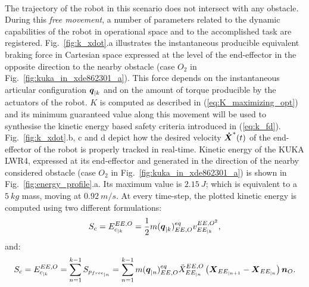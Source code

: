 \\
The trajectory of the robot in this scenario does not intersect with any obstacle. During this \textit{free movement}, a number of parameters related to the dynamic capabilities of the robot in operational space and to the accomplished task are registered. Fig.~\ref{fig:k_xdot}.a illustrates the instantaneous producible equivalent braking force in Cartesian space expressed at the level of the end-effector in the opposite direction to the nearby obstacle (case $O_2$ in Fig.~\ref{fig:kuka_in_xde862301_a}). This force depends on the instantaneous articular configuration $\mbox{\boldmath${q}$}_{|k}$ and on the amount of torque producible by the actuators of the robot. $K$ is computed as described in (\ref{eq:K_maximizing_opt}) and its minimum guaranteed value along this movement will be used to synthesise the kinetic energy based safety criteria introduced in (\ref{eq:k_fd}). Fig.~\ref{fig:k_xdot}.b, c and d depict how the desired velocity $\mbox{\boldmath${\dot{X}}$}^*(t)$ of the end-effector of the robot is properly tracked in real-time. 
Kinetic energy of the KUKA LWR4, expressed at its end-effector and generated in the direction of the nearby considered obstacle (case $O_2$ in Fig.~\ref{fig:kuka_in_xde862301_a}) is shown in Fig.~\ref{fig:energy_profile}.a. Its maximum value is $2.15~J$; which is equivalent to a $5~kg$ mass, moving at $0.92~m/s$.
At every time-step, the plotted kinetic energy is computed using two different formulations:
\begin{equation}
S_c = E_{c_{|k}}^{EE,O} = \frac{1}{2} m(\mbox{\boldmath${q}$}_{|k})_{EE,O}^{eq} v_{EE_{|k}}^{{EE,O}^2},
\label{eq:plotted_Sc}
\end{equation}
and: 
\begin{equation}
\begin{split}
S_c = E_{c_{|k}}^{EE,O} = \sum\limits_{n=1}^{k-1} S_{p_{free_{|n}}} =  \sum\limits_{n=1}^{k-1} m(\mbox{\boldmath${q}$}_{|n})_{EE,O}^{eq} \ddot{X}_{EE_{|n}}^{EE,O} \left(\mbox{\boldmath${X}$}_{EE_{|n+1}} - \mbox{\boldmath${X}$}_{EE_{|n}}\right) \mbox{\boldmath${n}$}_O.
\end{split}
\label{eq:plotted_Sc2}
\end{equation}
